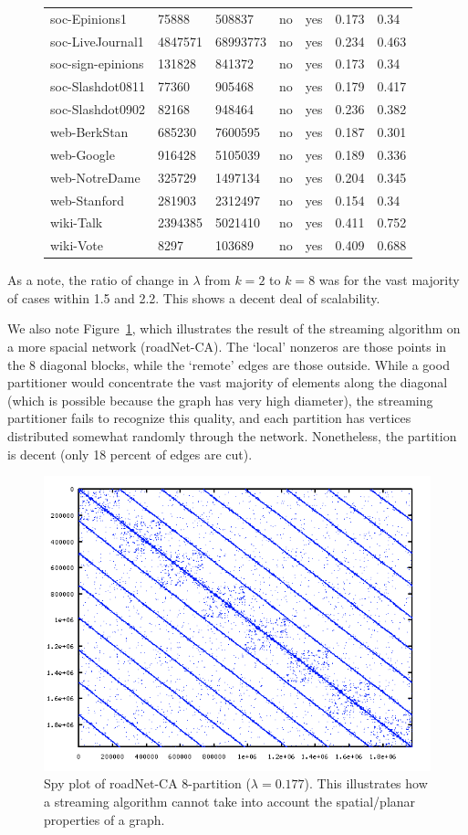 \begin{figure}
{\begin{tabular}{ *7l }
soc-Epinions1 & 75888 & 508837 & no & yes & 0.173&0.34\\ 
soc-LiveJournal1 & 4847571 & 68993773 & no & yes &0.234& 0.463\\ 
soc-sign-epinions & 131828 & 841372 & no & yes &0.173&0.34\\ 
soc-Slashdot0811 & 77360 & 905468 & no & yes &0.179&0.417\\ 
soc-Slashdot0902 & 82168 & 948464 & no & yes &0.236&0.382\\ 
web-BerkStan & 685230 & 7600595 & no & yes &0.187&0.301\\ 
web-Google & 916428 & 5105039 & no & yes &0.189&0.336\\ 
web-NotreDame & 325729 & 1497134 & no & yes &0.204&0.345\\ 
web-Stanford & 281903 & 2312497 & no & yes &0.154&0.34\\ 
wiki-Talk & 2394385 & 5021410 & no & yes &0.411&0.752\\ 
wiki-Vote  & 8297 & 103689 & no & yes &0.409&0.688\\ 
 \hline
\end{tabular}\par
}
\end{figure}

As a note, the ratio of change in $\lambda$ from $k=2$ to $k=8$ was for the vast majority of cases within 1.5 and 2.2. This shows a decent deal of scalability.

We also note Figure~\ref{fig:4}, which illustrates the result of the streaming algorithm on a more spacial network (roadNet-CA). The `local' nonzeros are those points in the 8 diagonal blocks, while the `remote' edges are those outside. While a good partitioner would concentrate the vast majority of elements along the diagonal (which is possible because the graph has very high diameter), the streaming partitioner fails to recognize this quality, and each partition has vertices distributed somewhat randomly through the network. Nonetheless, the partition is decent (only 18 percent of edges are cut). 

\begin{figure}[h!]
\centering
\includegraphics[width=0.8\columnwidth] {figures/roadNet-CA8.png}
\caption[Caption for]{Spy plot of roadNet-CA 8-partition ($\lambda=0.177$). This illustrates how a streaming algorithm cannot take into account the spatial/planar properties of a graph.}
\label{fig:4}
\end{figure}

